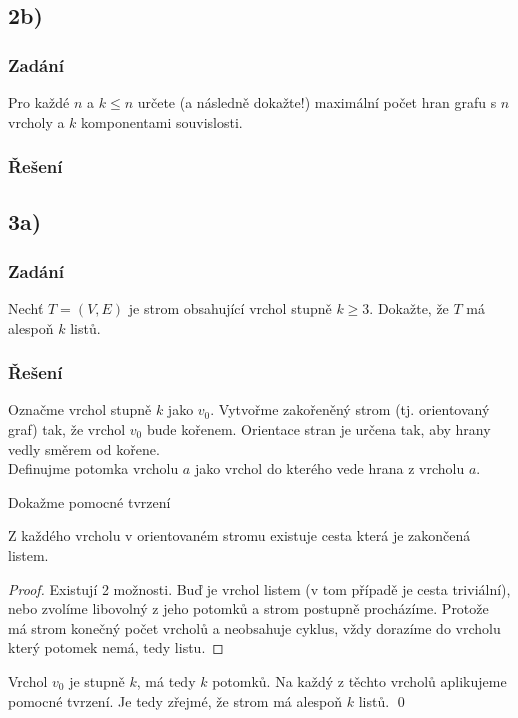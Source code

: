 \documentclass[../main.tex]{subfiles}
\begin{document}
\subsection*{2b)}
\subsubsection*{Zadání}
Pro každé $n$ a $k\leq n$ určete (a následně dokažte!) maximální počet hran grafu
s $n$ vrcholy a $k$ komponentami souvislosti.


\subsubsection*{Řešení}

\subsection*{3a)}
\subsubsection*{Zadání}
Nechť $T=(V,E)$ je strom obsahující vrchol stupně $k\geq 3$.
Dokažte, že $T$ má alespoň $k$ listů.
\subsubsection*{Řešení}

Označme vrchol stupně $k$ jako $v_0$. Vytvořme zakořeněný strom (tj. orientovaný graf) tak, že vrchol $v_0$ bude kořenem. 
Orientace stran je určena tak, aby hrany vedly směrem od kořene. \\
Definujme potomka vrcholu $a$ jako vrchol do kterého vede hrana z vrcholu $a$.

Dokažme pomocné tvrzení
\begin{lemma*}
    Z každého vrcholu v orientovaném stromu existuje cesta která je zakončená listem.
\end{lemma*}
\begin{proof}
    Existují 2 možnosti. Buď je vrchol listem (v tom případě je cesta triviální), 
    nebo zvolíme libovolný z jeho potomků a strom postupně procházíme.
    Protože má strom konečný počet vrcholů a neobsahuje cyklus, 
    vždy dorazíme do vrcholu který potomek nemá, tedy listu. 
\end{proof}

Vrchol $v_0$ je stupně $k$, má tedy $k$ potomků. Na každý z těchto vrcholů aplikujeme pomocné tvrzení.
Je tedy zřejmé, že strom má alespoň $k$ listů. \qed
\end{document}
